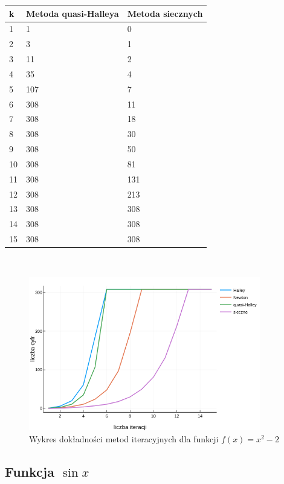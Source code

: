 \documentclass[11pt,a4paper]{article}
\begin{document}
    \begin{tabular}{|l|l|l|}
        \hline
        \textbf{k} & \textbf{Metoda quasi-Halleya} & \textbf{Metoda siecznych} \\
        \hline
        1 & 1 & 0 \\ 
        2 & 3 & 1 \\ 
        3 & 11 & 2 \\ 
        4 & 35 & 4 \\ 
        5 & 107 & 7 \\ 
        6 & 308 & 11 \\ 
        7 & 308 & 18 \\ 
        8 & 308 & 30 \\ 
        9 & 308 & 50 \\ 
        10 & 308 & 81 \\ 
        11 & 308 & 131 \\ 
        12 & 308 & 213 \\ 
        13 & 308 & 308 \\ 
        14 & 308 & 308 \\ 
        15 & 308 & 308 \\ 
        \hline
    \end{tabular}\\
    \begin{figure}[H]
        \includegraphics[width=0.9\textwidth]{wykr1}
        \caption{Wykres dokładności metod iteracyjnych dla funkcji $f(x) = x^2 - 2$}
    \end{figure}

    \subsection{Funkcja $\sin{x}$}
\end{document}
